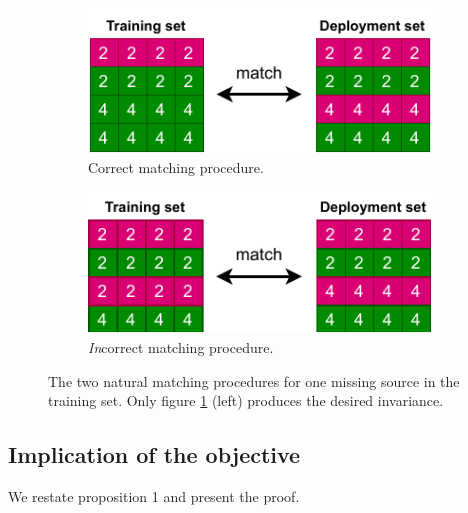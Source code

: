 \begin{figure}[htp]
  \begin{subfigure}{0.49\textwidth}
    \centering
    \includegraphics[width=0.9\linewidth]{supmatch/figures/illustrations/matching_diagram.pdf}
    \caption{Correct matching procedure.}%
    \label{fig:matching-repeated-correct}
  \end{subfigure}
  \begin{subfigure}{0.49\textwidth}
    \centering
    \includegraphics[width=0.9\linewidth]{supmatch/figures/illustrations/y-inv.pdf}
    \caption{\emph{In}correct matching procedure.}%
    \label{fig:matching-repeated-incorrect}
  \end{subfigure}
  \caption{%
    The two natural matching procedures for one missing source in the training set.
    Only figure \ref{fig:matching-repeated-correct} (left) produces the desired invariance.
  }%
  \label{fig:matching-repeated}
\end{figure}



\subsection{Implication of the objective}\label{implication-of-the-objective}
We restate proposition 1 and present the proof.

